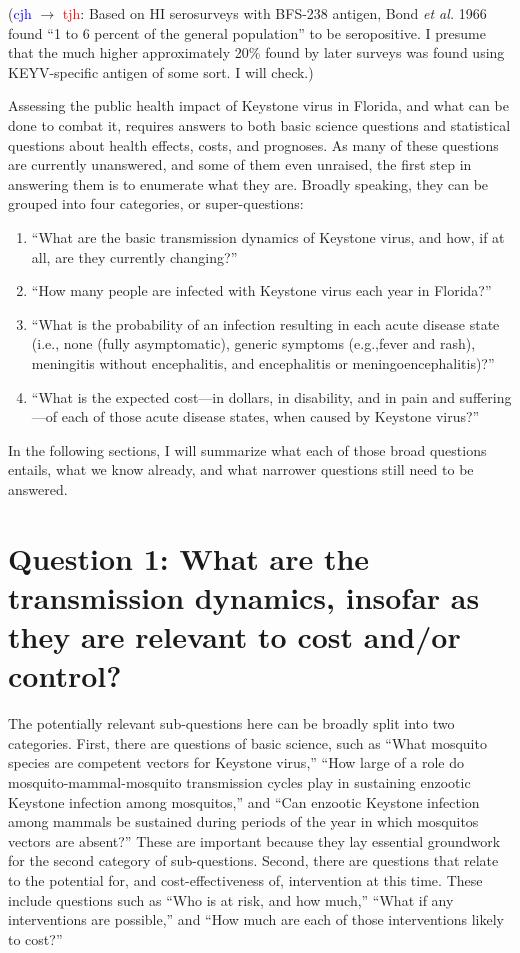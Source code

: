 \documentclass[12pt]{article}
\newcommand{\cjh}{\textcolor{blue}{cjh}}
\newcommand{\tjh}{\textcolor{red}{tjh}}
\newcommand{\msg}[3]{(#1 $\rightarrow$ #2: #3)}
\newcommand{\mct}[1]{\msg\cjh\tjh{#1}}
\begin{document}
        \mct{Based on HI serosurveys with BFS-238 antigen, Bond \textit{et al.} 1966 found ``1 to 6 percent of the general population'' to be seropositive. I presume that the much higher approximately 20\% found by later surveys was found using KEYV-specific antigen of some sort. I will check.}

        Assessing the public health impact of Keystone virus in Florida, and what can be done to combat it, requires answers to both basic science questions and statistical questions about health effects, costs, and prognoses. As many of these questions are currently unanswered, and some of them even unraised, the first step in answering them is to enumerate what they are. Broadly speaking, they can be grouped into four categories, or super-questions:
        \begin{enumerate}
            \item ``What are the basic transmission dynamics of Keystone virus, and how, if at all, are they currently changing?''
            \item ``How many people are infected with Keystone virus each year in Florida?''
            \item ``What is the probability of an infection resulting in each acute disease state (i.e., none (fully asymptomatic), generic symptoms (e.g.,fever and rash), meningitis without encephalitis, and encephalitis or meningoencephalitis)?''
            \item ``What is the expected cost---in dollars, in disability, and in pain and suffering---of each of those acute disease states, when caused by Keystone virus?''
        \end{enumerate}

        In the following sections, I will summarize what each of those broad questions entails, what we know already, and what narrower questions still need to be answered.

    \section[Transmission dynamics]{Question 1: What are the transmission dynamics, insofar as they are relevant to cost and/or control?}
    \label{transmission-dynamics}
        The potentially relevant sub-questions here can be broadly split into two categories. First, there are questions of basic science, such as ``What mosquito species are competent vectors for Keystone virus,'' ``How large of a role do mosquito-mammal-mosquito transmission cycles play in sustaining enzootic Keystone infection among mosquitos,'' and ``Can enzootic Keystone infection among mammals be sustained during periods of the year in which mosquitos vectors are absent?'' These are important because they lay essential groundwork for the second category of sub-questions. Second, there are questions that relate to the potential for, and cost-effectiveness of, intervention at this time. These include questions such as ``Who is at risk, and how much,'' ``What if any interventions are possible,'' and ``How much are each of those interventions likely to cost?''
\end{document}
